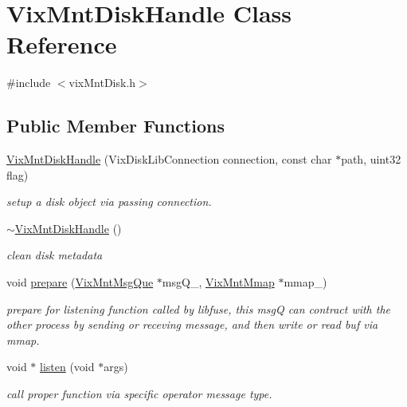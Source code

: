 \hypertarget{class_vix_mnt_disk_handle}{}\section{Vix\+Mnt\+Disk\+Handle Class Reference}
\label{class_vix_mnt_disk_handle}


{\ttfamily \#include $<$vix\+Mnt\+Disk.\+h$>$}

\subsection*{Public Member Functions}
\begin{DoxyCompactItemize}
\item 
\hyperlink{class_vix_mnt_disk_handle_a92186fd06d5467664f79b15a23453c78}{Vix\+Mnt\+Disk\+Handle} (Vix\+Disk\+Lib\+Connection connection, const char $\ast$path, uint32 flag)
\begin{DoxyCompactList}\small\item\em setup a disk object via passing connection. \end{DoxyCompactList}\item 
\hypertarget{class_vix_mnt_disk_handle_a22bc58dfbd7a00535abb8e5986de318c}{}\label{class_vix_mnt_disk_handle_a22bc58dfbd7a00535abb8e5986de318c} 
\hyperlink{class_vix_mnt_disk_handle_a22bc58dfbd7a00535abb8e5986de318c}{$\sim$\+Vix\+Mnt\+Disk\+Handle} ()
\begin{DoxyCompactList}\small\item\em clean disk metadata \end{DoxyCompactList}\item 
void \hyperlink{class_vix_mnt_disk_handle_a254eabad8d4f3c619898e131f0db7f36}{prepare} (\hyperlink{class_vix_mnt_msg_que}{Vix\+Mnt\+Msg\+Que} $\ast$msg\+Q\+\_\+, \hyperlink{class_vix_mnt_mmap}{Vix\+Mnt\+Mmap} $\ast$mmap\+\_\+)
\begin{DoxyCompactList}\small\item\em prepare for listening function called by libfuse, this msgQ can contract with the other process by sending or receving message, and then write or read buf via mmap. \end{DoxyCompactList}\item 
void $\ast$ \hyperlink{class_vix_mnt_disk_handle_aa6969e37bbfba234fe62aeb4bdf38fc9}{listen} (void $\ast$args)
\begin{DoxyCompactList}\small\item\em call proper function via specific operator message type. \end{DoxyCompactList}\item 

\end{DoxyCompactItemize}
